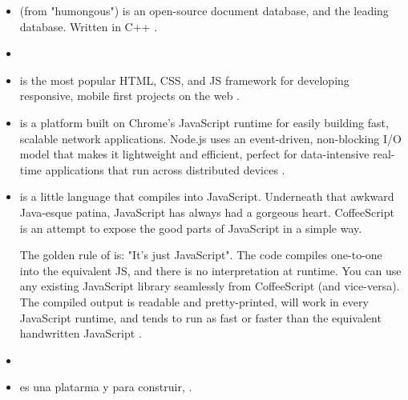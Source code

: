 \begin{itemize}
	\item \textbf{\mongodb} (from "humongous") is an open-source document database, and the leading \nosql database. Written in C++ \cite{technology_mongodb}.
	
	\item \textbf{\meteor} 
	
	\item \textbf{\bootstrap} is the most popular HTML, CSS, and JS framework for developing responsive, mobile first projects on the web \cite{technology_bootstrap}.
	
	\item \textbf{\nodejs} is a platform built on Chrome's JavaScript runtime for easily building fast, scalable network applications. Node.js uses an event-driven, non-blocking I/O model that makes it lightweight and efficient, perfect for data-intensive real-time applications that run across distributed devices \cite{technology_nodejs}.
	
	\item \textbf{\coffeescript} is a little language that compiles into JavaScript. Underneath that awkward Java-esque patina, JavaScript has always had a gorgeous heart. CoffeeScript is an attempt to expose the good parts of JavaScript in a simple way.
	
	The golden rule of \coffeescript is: "It's just JavaScript". The code compiles one-to-one into the equivalent JS, and there is no interpretation at runtime. You can use any existing JavaScript library seamlessly from CoffeeScript (and vice-versa). The compiled output is readable and pretty-printed, will work in every JavaScript runtime, and tends to run as fast or faster than the equivalent handwritten JavaScript \cite{technology_coffeescript}.
	
	\item \textbf{\grunttool} \cite{technology_gruntjs}
	
	\item \textbf{\docker} es una platarma \opensource y \sysadmins para construir,  \cite{technology_docker}.
	
\end{itemize}




